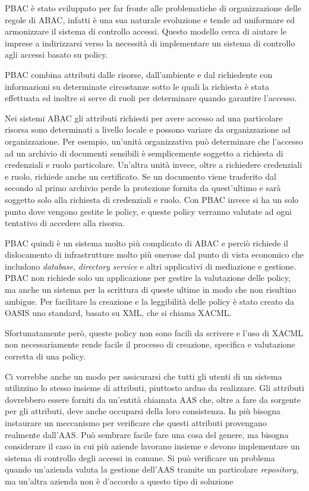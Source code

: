 \ac{PBAC} è stato sviluppato per far fronte alle problematiche di organizzazione delle regole di \ac{ABAC}, infatti è una sua naturale evoluzione e tende ad uniformare ed armonizzare il sistema di controllo accessi.
Questo modello cerca di aiutare le imprese a indirizzarsi verso la necessità di implementare un sistema di controllo agli accessi basato su policy.\par
\ac{PBAC} combina attributi dalle risorse, dall'ambiente e dal richiedente con informazioni su determinate circostanze sotto le quali la richiesta è stata effettuata ed inoltre si serve di 
ruoli per determinare quando garantire l'accesso.\par
Nei sistemi \ac{ABAC} gli attributi richiesti per avere accesso ad una particolare risorsa sono determinati a livello locale e possono variare da organizzazione ad organizzazione.
Per esempio, un'unità organizzativa può determinare che l'accesso ad un archivio di documenti sensibili è semplicemente soggetto a richiesta di credenziali e ruolo particolare.
Un'altra unità invece, oltre a richiedere credenziali e ruolo, richiede anche un certificato. Se un documento viene trasferito dal secondo al primo archivio perde la protezione fornita da quest'ultimo e sarà soggetto solo alla richiesta di credenziali e ruolo.
Con \ac{PBAC} invece si ha un solo punto dove vengono gestite le policy, e queste policy verranno valutate ad ogni tentativo di accedere alla risorsa.\par
\ac{PBAC} quindi è un sistema molto più complicato di \ac{ABAC} e perciò richiede il dislocamento di infrastrutture molto più onerose dal punto di vista economico che includono \textit{database}, \textit{directory service} e altri applicativi di mediazione e gestione.
\ac{PBAC} non richiede solo un applicazione per gestire la valutazione delle policy, ma
anche un sistema per la scrittura di queste ultime in modo che
non risultino ambigue.
Per facilitare la creazione e la leggibilità delle policy è stato creato da OASIS \cite{XACML} uno standard, basato su \ac{XML}, che si chiama \ac{XACML}.\par

Sfortunatamente però, queste policy non sono facili da scrivere e l’uso
di \ac{XACML} non necessariamente rende facile il processo di creazione, specifica e valutazione corretta di una policy. \par
Ci vorrebbe anche un modo per assicurarsi che tutti gli utenti di un sistema utilizzino lo stesso insieme di attributi, piuttosto arduo da realizzare. Gli attributi dovrebbero essere forniti da un’entità chiamata
\ac{AAS} che, oltre a fare da sorgente per gli
attributi, deve anche occuparsi della loro consistenza. In più bisogna instaurare
un meccanismo per verificare che questi attributi provengano
realmente dall’\ac{AAS}. Può sembrare facile fare una cosa del genere, ma
bisogna considerare il caso in cui più aziende lavorano insieme e devono
implementare un sistema di controllo degli accessi in comune. Si può verificare un problema
 quando un’azienda valuta la gestione dell’\ac{AAS}
tramite un particolare \textit{repository}, ma un’altra azienda non è d’accordo a
questo tipo di soluzione

